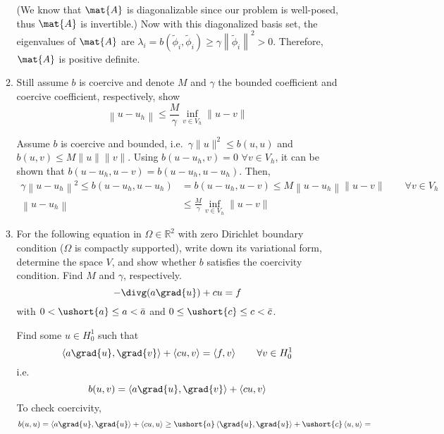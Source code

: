 \documentclass{article}
\newcommand\NoIndent[1]{%
  \begingroup
  \par
  \parshape0
  #1\par
  \endgroup
}
\begin{document}
\begin{enumerate}
\begin{enumerate}
{	(We know that $\mat{A}$ is diagonalizable since our problem is well-posed,
	thus $\mat{A}$ is invertible.)
	Now with this diagonalized basis set, the eigenvalues of $\mat{A}$ are
	$\lambda_i = b\left(\tilde{\phi}_i,\tilde{\phi}_i\right)
		\geq \gamma\left\|\tilde{\phi}_i\right\|^2 > 0$.
	Therefore, $\mat{A}$ is positive definite.
}
			\item Still assume $b$ is coercive and denote $M$ and $\gamma$ the bounded coefficient and
				coercive coefficient, respectively, show
				\begin{equation*}
					\left\|u - u_h\right\| \leq \frac{M}{\gamma}\inf_{v\in V_h}\|u - v\|
				\end{equation*}
\NoIndent{
	Assume $b$ is coercive and bounded, i.e.\ $\gamma\|u\|^2 \leq b(u,u)$ and $b(u,v) \leq M \|u\|\|v\|$.
	Using $b\left(u-u_h,v\right) = 0$ $\forall v \in V_h$, it can be shown that
	$b\left(u-u_h,u-v\right) = b\left(u-u_h,u-u_h\right)$.
	Then,
	\begin{align*}
		\gamma\left\|u-u_h\right\|^2 \leq b\left(u-u_h,u-u_h\right) &= b\left(u-u_h,u-v\right)
			\leq M \left\|u-u_h\right\|\|u-v\| \qquad \forall v \in V_h \\
		\left\|u - u_h\right\| &\leq \frac{M}{\gamma}\inf_{v\in V_h}\|u - v\|
	\end{align*}
}
			\item For the following equation in $\Omega \in \mathbb{R}^2$
				with zero Dirichlet boundary condition ($\Omega$ is compactly supported),
				write down its variational form, determine the space $V$,
				and show whether $b$ satisfies the coercivity condition.
				Find $M$ and $\gamma$, respectively.
				\begin{equation*}
					-\divg(a\grad{u}) + cu = f
				\end{equation*}
				with $0 < \ushort{a} \leq a < \bar{a}$ and $0 \leq \ushort{c} \leq c < \bar{c}$.
\NoIndent{
	Find some $u \in H_0^1$ such that
	\begin{equation*}
		\left<a\grad{u},\grad{v}\right> + \left<cu,v\right> = \left<f,v\right> \qquad \forall v \in H_0^1
	\end{equation*}
	i.e.
	\begin{equation*}
		b(u,v) = \left<a\grad{u},\grad{v}\right> + \left<cu,v\right>
	\end{equation*}
	To check coercivity,
	\begin{equation*}
		b(u,u) = \left<a\grad{u},\grad{u}\right> + \left<cu,u\right> \geq
			\ushort{a}\left<\grad{u},\grad{u}\right> + \ushort{c}\left<u,u\right> =

\end{equation*}}
\end{enumerate}
\end{enumerate}
\end{document}

